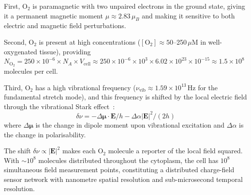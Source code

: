 \documentclass[11pt,twocolumn,a4paper]{article}
\theoremstyle{definition}
\theoremstyle{remark}
\newcommand{\vv}[1]{\boldsymbol{#1}}
\begin{document}
First, $\mathrm{O}_2$ is paramagnetic with two unpaired electrons in the ground state, giving it a permanent magnetic moment $\mu \approx 2.83\,\mu_B$ and making it sensitive to both electric and magnetic field perturbations.

Second, $\mathrm{O}_2$ is present at high concentrations ($[\mathrm{O}_2] \approx 50$--250\,$\mu$M in well-oxygenated tissue), providing $N_{\mathrm{O}_2} = 250 \times 10^{-6} \times N_A \times V_{\mathrm{cell}} \approx 250 \times 10^{-6} \times 10^3 \times 6.02 \times 10^{23} \times 10^{-15} \approx 1.5 \times 10^8$ molecules per cell.

Third, $\mathrm{O}_2$ has a high vibrational frequency ($\nu_{\mathrm{vib}} \approx 1.59 \times 10^{13}$\,Hz for the fundamental stretch mode), and this frequency is shifted by the local electric field through the vibrational Stark effect~\cite{Oklejas2002,Boxer2009}:
\begin{equation}
  \delta\nu = -\Delta\vv{\mu} \cdot \vv{E} / h - \Delta\alpha |\vv{E}|^2 / (2h)
  \label{eq:stark_effect}
\end{equation}
where $\Delta\vv{\mu}$ is the change in dipole moment upon vibrational excitation and $\Delta\alpha$ is the change in polarisability.

The shift $\delta\nu \propto |\vv{E}|^2$ makes each $\mathrm{O}_2$ molecule a reporter of the local field squared. With $\sim\!10^8$ molecules distributed throughout the cytoplasm, the cell has $10^8$ simultaneous field measurement points, constituting a distributed charge-field sensor network with nanometre spatial resolution and sub-microsecond temporal resolution.
\end{document}
